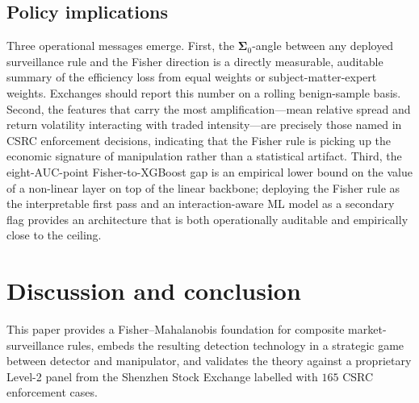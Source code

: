 \documentclass[11pt,a4paper]{article}
\theoremstyle{definition}
\theoremstyle{remark}
\newcommand{\1}{\mathbf{1}}
\newcommand{\Sig}{\boldsymbol{\Sigma}}
\begin{document}
\subsection{Policy implications}
\label{sec:emp-policy}
Three operational messages emerge. First, the $\Sig_0$-angle between any deployed surveillance rule and the Fisher direction is a directly measurable, auditable summary of the efficiency loss from equal weights or subject-matter-expert weights. Exchanges should report this number on a rolling benign-sample basis. Second, the features that carry the most amplification---mean relative spread and return volatility interacting with traded intensity---are precisely those named in CSRC enforcement decisions, indicating that the Fisher rule is picking up the economic signature of manipulation rather than a statistical artifact. Third, the eight-AUC-point Fisher-to-XGBoost gap is an empirical lower bound on the value of a non-linear layer on top of the linear backbone; deploying the Fisher rule as the interpretable first pass and an interaction-aware ML model as a secondary flag provides an architecture that is both operationally auditable and empirically close to the ceiling.

\section{Discussion and conclusion}
\label{sec:concl}

This paper provides a Fisher--Mahalanobis foundation for composite market-surveillance rules, embeds the resulting detection technology in a strategic game between detector and manipulator, and validates the theory against a proprietary Level-2 panel from the Shenzhen Stock Exchange labelled with $165$ CSRC enforcement cases.
\end{document}
